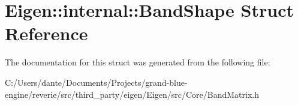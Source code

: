 \hypertarget{struct_eigen_1_1internal_1_1_band_shape}{}\section{Eigen\+::internal\+::Band\+Shape Struct Reference}
\label{struct_eigen_1_1internal_1_1_band_shape}


The documentation for this struct was generated from the following file\+:\begin{DoxyCompactItemize}
\item 
C\+:/\+Users/dante/\+Documents/\+Projects/grand-\/blue-\/engine/reverie/src/third\+\_\+party/eigen/\+Eigen/src/\+Core/Band\+Matrix.\+h\end{DoxyCompactItemize}
